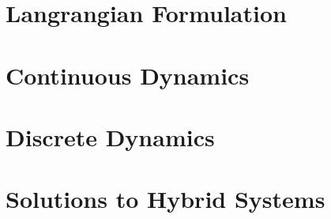 \section{Langrangian Formulation}

%
%

\section{Continuous Dynamics}

\section{Discrete Dynamics}

\section{Solutions to Hybrid Systems}
